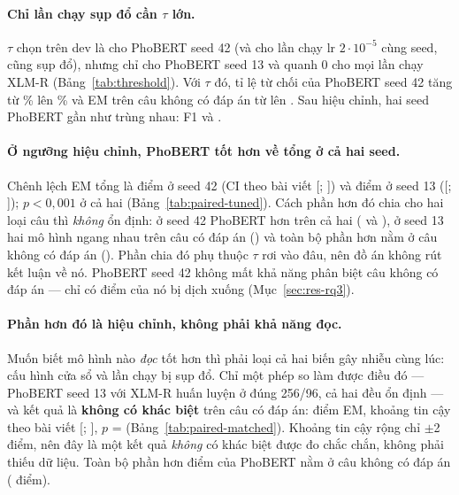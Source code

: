 \paragraph{Chỉ lần chạy sụp đổ cần $\tau$ lớn.} $\tau$ chọn trên dev là \ThrPhobertTau{} cho PhoBERT seed 42 (và
\ThrPhobertRunBTau{} cho lần chạy lr $2\cdot10^{-5}$ cùng seed, cũng sụp đổ), nhưng chỉ \ThrPhobertRunDTau{} cho
PhoBERT seed 13 và quanh 0 cho mọi lần chạy XLM-R (Bảng~\ref{tab:threshold}). Với $\tau$ đó, tỉ lệ từ chối
của PhoBERT seed 42 tăng từ \ThrPhobertAbsRateZero\% lên \ThrPhobertAbsRate\% và EM trên câu không có đáp án
từ \ThrPhobertImpEMZero{} lên \ThrPhobertImpEM. Sau hiệu chỉnh, hai seed PhoBERT gần như trùng nhau: F1
\ThrPhobertRunAFone{} và \ThrPhobertRunDFone.

\paragraph{Ở ngưỡng hiệu chỉnh, PhoBERT tốt hơn về tổng ở cả hai seed.} Chênh lệch EM tổng là \PairTDiff{}
điểm ở seed 42 (CI theo bài viết [\PairTArtLo; \PairTArtHi]) và \PairSTDiff{} điểm ở seed 13
([\PairSTArtLo; \PairSTArtHi]); $p < 0{,}001$ ở cả hai (Bảng~\ref{tab:paired-tuned}). Cách phần hơn đó chia cho
hai loại câu thì \emph{không} ổn định: ở seed 42 PhoBERT hơn trên cả hai (\PairTAnsDiff{} và \PairTImpDiff), ở
seed 13 hai mô hình ngang nhau trên câu có đáp án (\PairSTAnsDiff) và toàn bộ phần hơn nằm ở câu không có
đáp án (\PairSTImpDiff). Phần chia đó phụ thuộc $\tau$ rơi vào đâu, nên đồ án không rút kết luận về nó.
PhoBERT seed 42 không mất khả năng phân biệt câu không có đáp án --- chỉ có điểm \code{[CLS]} của nó bị dịch
xuống (Mục~\ref{sec:res-rq3}).

\paragraph{Phần hơn đó là hiệu chỉnh, không phải khả năng đọc.} Muốn biết mô hình nào \emph{đọc} tốt hơn thì
phải loại cả hai biến gây nhiễu cùng lúc: cấu hình cửa sổ và lần chạy bị sụp đổ. Chỉ một phép so làm được điều
đó --- PhoBERT seed 13 với XLM-R huấn luyện ở đúng 256/96, cả hai đều ổn định --- và kết quả là
\textbf{không có khác biệt} trên câu có đáp án: \PairMAnsDiff{} điểm EM, khoảng tin cậy theo bài viết
[\PairMAnsArtLo; \PairMAnsArtHi], $p$ = \PairMAnsP{} (Bảng~\ref{tab:paired-matched}). Khoảng tin cậy rộng chỉ
$\pm$2 điểm, nên đây là một kết quả \emph{không} có khác biệt được đo chắc chắn, không phải thiếu dữ liệu.
Toàn bộ phần hơn \PairMDiff{} điểm của PhoBERT nằm ở câu không có đáp án (\PairMImpDiff{} điểm).

